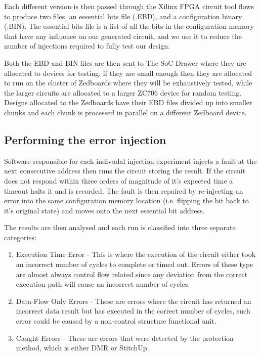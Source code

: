 Each different version is then passed through the Xilinx FPGA circuit tool flows to produce
two files, an essential bits file (.EBD), and a configuration binary (.BIN).
The essential bits file is a list of all the bits in the configuration memory that have any
influence on our generated circuit, and we use it to reduce the number of injections
required to fully test our design.

Both the EBD and BIN files are then sent to The SoC Drawer where they are allocated to
devices for testing, if they are small enough then they are allocated to run on the 
cluster of Zedboards where they will be exhaustively tested, while the larger circuits 
are allocated to a larger ZC706 device for random testing.
Designs allocated to the Zedboards have their EBD files divided up
into smaller chunks and each chunk is processed in parallel on a different Zedboard device.

\subsection{Performing the error injection}
Software responsible for each indivudal injection experiment injects a fault at the 
next consecutive address then runs the circuit storing the result.
If the circuit does not respond within three orders of magnitude of it's expected time
a timeout halts it and is recorded.
The fault is then repaired by re-injecting an error into the
same configuration memory location (i.e. flipping the bit back to it's original state)
and moves onto the next essential bit address.

The results are then analysed and each run is classified into three separate categories:

\begin{enumerate}
\setlength{\itemsep}{1pt}
\setlength{\parskip}{0pt}
\setlength{\parsep}{0pt}
\item Execution Time Error - This is where the execution of the circuit either took
an incorrect number of cycles to complete or timed out. Errors of these type are almost
always control flow related since any deviation from the correct execution path will cause
an incorrect number of cycles.
\item Data-Flow Only Errors - These are errors where the circuit has returned an incorrect
data result but has executed in the correct number of cycles, such error could be caused
by a non-control structure functional unit.
\item Caught Errors - These are errors that were detected by the protection method, which is
either DMR or StitchUp.
\end{enumerate}
